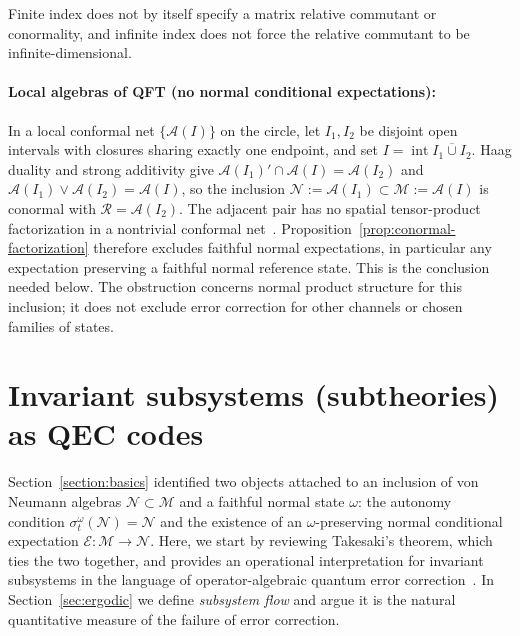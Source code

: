 \documentclass[a4paper,11pt]{article}
\theoremstyle{definition}
\newcommand{\mR}{\mathcal{R}}
\newcommand{\mN}{\mathcal{N}}
\newcommand{\mM}{\mathcal{M}}
\newcommand{\mE}{\mathcal{E}}
\begin{document}
Finite index does not by itself specify a matrix relative commutant or conormality, and infinite index does not force the relative commutant to be infinite-dimensional.

\paragraph{Local algebras of QFT (no normal conditional expectations):}
In a local conformal net $\{\mathcal{A}(I)\}$ on the circle, let $I_1,I_2$ be disjoint
open intervals with closures sharing exactly one endpoint, and set $I=\operatorname{int}\overline{I_1\cup I_2}$.
Haag duality and strong additivity give $\mathcal{A}(I_1)'\cap\mathcal{A}(I)=\mathcal{A}(I_2)$
and $\mathcal{A}(I_1)\vee\mathcal{A}(I_2)=\mathcal{A}(I)$, so the inclusion
$\mN:=\mathcal{A}(I_1)\subset\mM:=\mathcal{A}(I)$ is conormal with
$\mR=\mathcal A(I_2)$. The adjacent pair has no spatial tensor-product
factorization in a nontrivial conformal net~\cite{Wiesbrock1993}.
Proposition~\ref{prop:conormal-factorization} therefore excludes faithful normal expectations, in particular any expectation preserving a faithful normal reference state. This is the conclusion needed below. The obstruction concerns normal product structure for this inclusion; it does not exclude error correction for other channels or chosen families of states.


\section{Invariant subsystems (subtheories) as QEC codes}\label{sec:QEC}

Section~\ref{section:basics} identified two objects attached to an inclusion of von Neumann algebras $\mN\subset \mM$ and a faithful normal state $\omega$: the autonomy condition $\sigma^{\omega}_t(\mN)=\mN$ and the existence of an $\omega$-preserving normal conditional expectation $\mE:\mM\to\mN$. Here, we start by reviewing Takesaki's theorem, which ties the two together, and provides an operational interpretation for invariant subsystems in the language of operator-algebraic quantum error correction~\cite{Faulkner2020,FaulknerSperanza2024}. In Section~\ref{sec:ergodic} we define {\it subsystem flow} and argue it is the natural quantitative measure of the failure of error correction.
\end{document}
